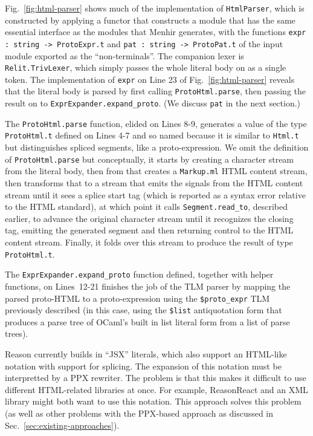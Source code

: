 \documentclass[acmsmall,screen]{acmart}
\newcommand{\li}[1]{\lstinline[basicstyle=\ttfamily\fontsize{9pt}{1em}\selectfont]{#1}}
\begin{document}
Fig.~\ref{fig:html-parser} shows much of the implementation of \li{HtmlParser},  which is constructed by applying a functor that constructs a module that has the same essential interface as the modules that Menhir generates, with the functions \li{expr : string -> ProtoExpr.t} and \li{pat : string -> ProtoPat.t} of the input module exported as the ``non-terminals''. The companion lexer is \li{Relit.TrivLexer}, which simply passes the whole literal body on as a single token. The implementation of \li{expr} on Line 23 of Fig.~\ref{fig:html-parser} reveals that the literal body is parsed by first calling \li{ProtoHtml.parse}, then passing the result on to \li{ExprExpander.expand_proto}. (We discuss \li{pat} in the next section.)

The \li{ProtoHtml.parse} function, elided on Lines 8-9, generates a value of the type \li{ProtoHtml.t} defined on Lines 4-7 and so named because it is similar to \li{Html.t} but distinguishes spliced segments, like a proto-expression. We omit the definition of \li{ProtoHtml.parse} but conceptually, it starts by creating a character stream from the literal body, then from that creates a \li{Markup.ml} HTML content stream, then transforms that to a stream that emits the signals from the HTML content stream until it sees a splice start tag (which is reported as a syntax error relative to the HTML standard), at which point it calls \li{Segment.read_to}, described earlier, to advance the original character stream until it recognizes the closing tag, emitting the generated segment and then returning control to the HTML content stream. Finally, it folds over this stream to produce the result of type \li{ProtoHtml.t}. 

The \li{ExprExpander.expand_proto} function defined, together with helper functions, on Lines~12-21 finishes the job of the TLM parser by mapping the parsed proto-HTML to a proto-expression using the \li{$proto_expr} TLM previously described (in this case, using the \li{$list} antiquotation form that produces a parse tree of OCaml's built in list literal form from a list of parse trees).%

Reason currently builds in ``JSX'' literals, which also support an HTML-like notation with support for splicing. The expansion of this notation must be interpretted by a PPX rewriter. The problem is that this makes it difficult to use different HTML-related libraries at once. For example, ReasonReact and an XML library might both want to use this notation. This approach solves this problem (as well as other problems with the PPX-based approach as discussed in Sec.~\ref{sec:existing-approaches}).
\end{document}
